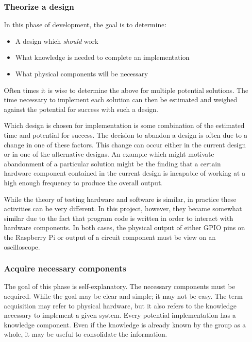 \documentclass{article}	%
\begin{document}
\begin{multicols}{2}
\subsubsection{Theorize a design}
In this phase of development,
the goal is to determine:
\begin{itemize}
\item A design which \emph{should} work
\item What knowledge is needed to complete an implementation
\item What physical components will be necessary
\end{itemize}

Often times it is wise to determine the above for
multiple potential solutions.
The time necessary to implement each solution
can then be estimated and weighed against
the potential for success with such a design.

Which design is chosen for implementation is
some combination of the estimated time and
potential for success.
The decision to abandon a design is often
due to a change in one of these factors.
This change can occur either
in the current design or
in one of the alternative designs.
An example which might motivate abandonment of a 
particular solution might be
the finding that a certain hardware component
contained in the current design is incapable of 
working at a high enough frequency to
produce the overall output.

While the theory of testing hardware and software is similar,
in practice these activities can be very different.
In this project, however,
they became somewhat similar 
due to the fact that program code is written in order to 
interact with hardware components.
In both cases,
the physical output of either GPIO pins on the Raspberry Pi
or output of a circuit component must be view on
an oscilloscope.

\subsubsection{Acquire necessary components}
The goal of this phase is self-explanatory.
The necessary components must be acquired.
While the goal may be clear and simple;
it may not be easy.
The term acquisition may refer to  physical hardware,
but it also refers to the knowledge necessary to implement
a given system.
Every potential implementation has a knowledge component.
Even if the knowledge is already known by the group as a whole,
it may be useful to consolidate the information.


\end{multicols}
\end{document}
